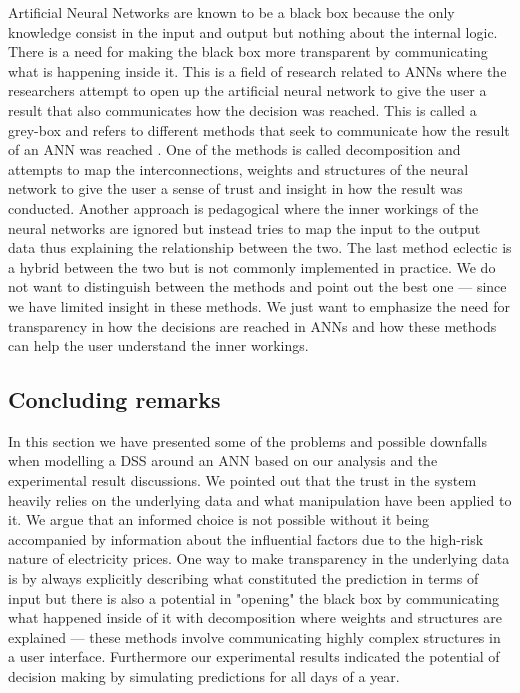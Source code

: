 Artificial Neural Networks are known to be a black box \cite{fromBlackBoxToTransparentBox} because the only knowledge consist in the input and output but nothing about the internal logic. There is a need for making the black box more transparent by communicating what is happening inside it. This is a field of research related to ANNs where the researchers attempt to open up the artificial neural network to give the user a result that also communicates how the decision was reached. This is called a grey-box and refers to different methods that seek to communicate how the result of an ANN was reached \cite{young2010using}. One of the methods is called decomposition and attempts to map the interconnections, weights and structures of the neural network to give the user a sense of trust and insight in how the result was conducted. Another approach is pedagogical where the inner workings of the neural networks are ignored but instead tries to map the input to the output data thus explaining the relationship between the two. The last method eclectic is a hybrid between the two but is not commonly implemented in practice. We do not want to distinguish between the methods and point out the best one --- since we have limited insight in these methods. We just want to emphasize the need for transparency in how the decisions are reached in ANNs and how these methods can help the user understand the inner workings.

\subsection{Concluding remarks}
In this section we have presented some of the problems and possible downfalls when modelling a DSS around an ANN based on our analysis and the experimental result discussions. We pointed out that the trust in the system heavily relies on the underlying data and what manipulation have been applied to it. We argue that an informed choice is not possible without it being accompanied by information about the influential factors due to the high-risk nature of electricity prices. One way to make transparency in the underlying data is by always explicitly describing what constituted the prediction in terms of input but there is also a potential in "opening" the black box by communicating what happened inside of it with decomposition where weights and structures are explained --- these methods involve communicating highly complex structures in a user interface. Furthermore our experimental results indicated the potential of decision making by simulating predictions for all days of a year.

